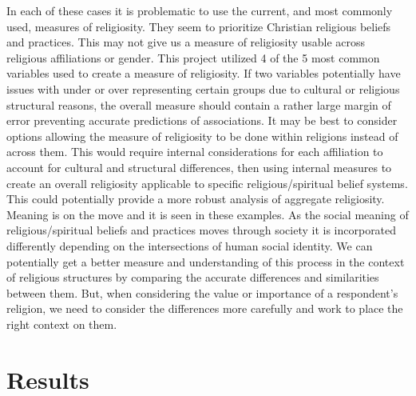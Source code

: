 \documentclass[
  12pt,
  letterpaper,
]{article}
\begin{document}
In each of these cases it is problematic to use the current, and most
commonly used, measures of religiosity. They seem to prioritize
Christian religious beliefs and practices. This may not give us a
measure of religiosity usable across religious affiliations or gender.
This project utilized 4 of the 5 most common variables used to create a
measure of religiosity. If two variables potentially have issues with
under or over representing certain groups due to cultural or religious
structural reasons, the overall measure should contain a rather large
margin of error preventing accurate predictions of associations. It may
be best to consider options allowing the measure of religiosity to be
done within religions instead of across them. This would require
internal considerations for each affiliation to account for cultural and
structural differences, then using internal measures to create an
overall religiosity applicable to specific religious/spiritual belief
systems. This could potentially provide a more robust analysis of
aggregate religiosity. Meaning is on the move and it is seen in these
examples. As the social meaning of religious/spiritual beliefs and
practices moves through society it is incorporated differently depending
on the intersections of human social identity. We can potentially get a
better measure and understanding of this process in the context of
religious structures by comparing the accurate differences and
similarities between them. But, when considering the value or importance
of a respondent's religion, we need to consider the differences more
carefully and work to place the right context on them.

\hypertarget{results}{%
\section{Results}\label{results}}
\end{document}
